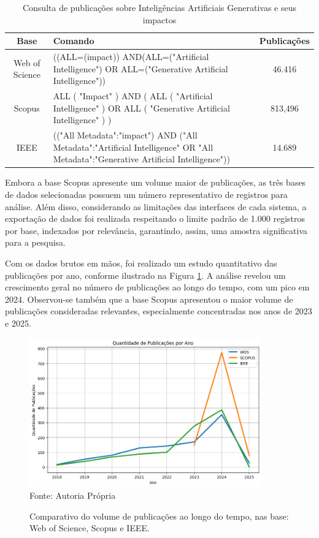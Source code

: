 \documentclass[openany,oneside,a4paper,9pt]{extarticle}
\begin{document}
\begin{table}[H]
    \centering
    {\footnotesize
    \begin{tabular}{c>{\raggedright\arraybackslash}m{10cm}c}
        \hline
        \textbf{Base} & \textbf{Comando} & \textbf{Publicações} \\
        \hline
        Web of Science & ((ALL=(impact)) AND(ALL=("Artificial Intelligence") OR ALL=("Generative Artificial Intelligence")) & 46.416 \\\hline
        Scopus & ALL ( "Impact" ) AND ( ALL ( "Artificial Intelligence" ) OR ALL ( "Generative Artificial Intelligence" ) ) & 813,496 \\\hline
        IEEE & (("All Metadata":"impact") AND ("All Metadata":"Artificial Intelligence" OR "All Metadata":"Generative Artificial Intelligence")) & 14.689 \\
        \hline
    \end{tabular}
    }
    \caption{Consulta de publicações sobre Inteligências Artificiais Generativas e seus impactos}
    \label{tab:publicacoes}
\end{table}

Embora a base Scopus apresente um volume maior de publicações, as três bases de dados selecionadas possuem um número representativo de registros para análise. Além disso, considerando as limitações das interfaces de cada sistema, a exportação de dados foi realizada respeitando o limite padrão de 1.000 registros por base, indexados por relevância, garantindo, assim, uma amostra significativa para a pesquisa.

Com os dados brutos em mãos, foi realizado um estudo quantitativo das publicações por ano, conforme ilustrado na Figura \ref{fig:2}. A análise revelou um crescimento geral no número de publicações ao longo do tempo, com um pico em 2024. Observou-se também que a base Scopus apresentou o maior volume de publicações consideradas relevantes, especialmente concentradas nos anos de 2023 e 2025.

\begin{figure}[H]
    \centering
    \caption{Comparativo do volume de publicações ao longo do tempo, nas base: Web of Science, Scopus e IEEE.}
    \includegraphics[width=10cm]{Comparativo_volume_de_publicações_impacto.png}
    {\\\footnotesize Fonte: Autoria Própria}
    \label{fig:2}
\end{figure}
\end{document}

